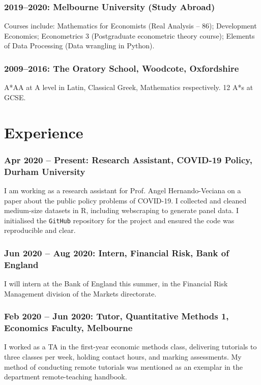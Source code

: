 \documentclass[letterpaper]{article}
\begin{document}
\subsubsection*{2019--2020: Melbourne University (Study Abroad)}
  Courses include: Mathematics for Economists (Real Analysis -- 86); Development Economics; Econometrics 3 (Postgraduate econometric theory course); Elements of Data Processing (Data wrangling in Python).

\subsubsection*{2009--2016: The Oratory School, Woodcote, Oxfordshire}
A*AA at A level in Latin, Classical Greek, Mathematics respectively. 12 A*s at GCSE.
  



\section*{Experience}
\subsubsection*{Apr 2020 -- Present: Research Assistant, COVID-19 Policy, Durham University}
I am working as a research assistant for Prof. Angel Hernando-Veciana on a paper about the public policy problems of COVID-19. I collected and cleaned medium-size datasets in R, including webscraping to generate panel data. I initialised the \texttt{GitHub} repository for the project and ensured the code was reproducible and clear. %


\subsubsection*{Jun 2020 -- Aug 2020: Intern, Financial Risk, Bank of England}
I will intern at the Bank of England this summer, in the Financial Risk Management division of the Markets directorate.

\subsubsection*{Feb 2020 -- Jun 2020: Tutor, Quantitative Methods 1, Economics Faculty, Melbourne}
I worked as a TA in the first-year economic methods class, delivering tutorials to three classes per week, holding contact hours, and marking assessments. My method of conducting remote tutorials was mentioned as an exemplar in the department remote-teaching handbook.
\end{document}
